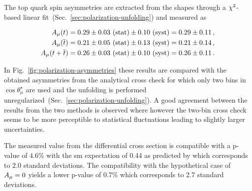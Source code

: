 The top quark spin asymmetries are extracted from the shapes through a $\chi^\scriptn{2}$-based linear fit~(Sec.~\ref{sec:polarization-unfolding}) and measured as

\newcommand{\AlResultCombined}{\ensuremath{0.26\pm 0.11 }\xspace}
\newcommand{\AlResultCombinedStatSys}{\ensuremath{0.26\pm 0.03~\mathrm{(stat)}\pm 0.10~\mathrm{(syst)}} \xspace}
\newcommand{\AlResultCombinedPvalue}{\ensuremath{4.6\% }\xspace}
\newcommand{\AlResultCombinedSvalue}{\ensuremath{2.0}\xspace}

\newcommand{\AlResultTop}{\ensuremath{0.29\pm 0.11 }\xspace}
\newcommand{\AlResultTopStatSys}{\ensuremath{0.29 \pm 0.03~\mathrm{(stat)} \pm 0.10~\mathrm{(syst)} }\xspace}
\newcommand{\AlResultTopPvalue}{\ensuremath{7.9\% } \xspace}
\newcommand{\AlResultTopSvalue}{\ensuremath{1.8}\xspace}

\newcommand{\AlResultAntiTop}{\ensuremath{0.21\pm 0.14 }\xspace}
\newcommand{\AlResultAntiTopStatSys}{\ensuremath{0.21\pm 0.05~\mathrm{(stat)}\pm 0.13~\mathrm{(syst)}}\xspace}
\newcommand{\AlResultAntiTopPvalue}{\ensuremath{5.0\% }\xspace}
\newcommand{\AlResultAntiTopSvalue}{\ensuremath{2.0}\xspace}

\begin{subequations}
\begin{align}
\AmuT          & = \AlResultTopStatSys = \AlResultTop\,, \\
\AmuTbar       & = \AlResultAntiTopStatSys = \AlResultAntiTop\,, \\
\AmuTplusTbar & = \AlResultCombinedStatSys = \AlResultCombined\,.
\end{align}
\end{subequations}

In Fig.~\ref{fig:polarization-asymmetries} these results are compared with the obtained asymmetries from the analytical cross check for which only two bins in $\cos\theta^\star_\mu$ are used and the unfolding is performed unregularized~(Sec.~\ref{sec:polarization-unfolding}). A good agreement between the results from the two methods is observed where however the two-bin cross check seems to be more perceptible to statistical fluctuations leading to slightly larger uncertainties. 

The measured \AmuTplusTbar value from the differential cross section is compatible with a p-value of \AlResultCombinedPvalue with the \gls{sm} expectation of 0.44 as predicted by \POWHEG which corresponds to \AlResultCombinedSvalue standard deviations. The compatibility with the hypothetical case of $A_{\mu}=0$ yields a lower p-value of 0.7\% which corresponds to 2.7 standard deviations.


